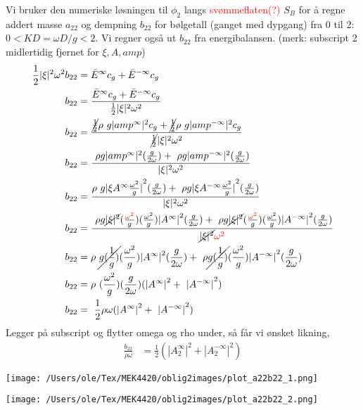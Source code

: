 Vi bruker den numeriske løsningen til $\phi_2$ langs \textcolor{red}{svømmeflaten(?)} $S_B$ for å regne addert masse $a_{22}$ og dempning $b_{22}$ for bølgetall (ganget med dypgang) fra 0 til 2: $0 < KD = \omega D / g < 2$. Vi regner også ut $b_{22}$ fra energibalansen. %
(merk: subscript 2 midlertidig fjernet for $\xi, A, amp$)
\begin{align}
	\frac{1}{2} |\xi|^2 \omega^2 b_{22} &=  {\bar{E}^{\infty} c_g + \bar{E}^{-\infty} c_g }\\
	b_{22} &=  \frac{\bar{E}^{\infty} c_g + \bar{E}^{-\infty} c_g }{\frac{1}{2} |\xi|^2 \omega^2}\\
	b_{22} &=  \frac{\cancel{\frac{1}{2}}\rho g |amp^{\infty}|^2  c_g + \cancel{\frac{1}{2}}\rho g |amp^{-\infty}|^2 c_g }{\cancel{\frac{1}{2}} |\xi|^2 \omega^2}\\
	b_{22} &=  \frac{ \rho g |amp^{\infty}|^2  (\frac{g}{2\omega}) +  \rho g |amp^{-\infty}|^2 (\frac{g}{2\omega}) }{ |\xi|^2 \omega^2}\\
	b_{22} &=  \frac{\rho g {|\xi A^{\infty} \frac{\omega^2}{g}|}^2  (\frac{g}{2\omega}) +  \rho g {|\xi A^{-\infty} \frac{\omega^2}{g}|}^2  (\frac{g}{2\omega}) }{ |\xi|^2 \omega^2}\\
	b_{22} &=  \frac{  \rho g \cancel{|\xi|^2} (\frac{\color{red}{\omega^2}}{g})(\frac{\omega^2}{g}) {| A^{\infty} |}^2  (\frac{g}{2\omega}) + \rho g \cancel{|\xi|^2}  (\frac{\color{red}{\omega^2}}{g})(\frac{\omega^2}{g}) {| A^{-\infty}|}^2  (\frac{g}{2\omega}) }{ \cancel{|\xi|^2} \color{red}{\omega^2}}\\
	b_{22} &=   \rho  \cancel{g  (\frac{1}{g})}(\frac{\omega^2}{g}) {| A^{\infty} |}^2  (\frac{g}{2\omega}) +  \rho \cancel{g   (\frac{1}{g})}(\frac{\omega^2}{g}) {| A^{-\infty}|}^2  (\frac{g}{2\omega}) \\
	b_{22} &=  \rho  (\frac{\omega^2}{g})   (\frac{g}{2\omega}) ({| A^{\infty} |}^2 +  {| A^{-\infty}|}^2)\\
	b_{22} &=    \frac{1}{2} \rho \omega ({| A^{\infty} |}^2 +  {| A^{-\infty}|}^2)
\end{align}
Legger på subscript og flytter omega og rho under, så får vi ønsket likning, 
\begin{align}
	\frac{b_{22}}{\rho \omega} &=    \frac{1}{2}  ({| A_2^{\infty} |}^2 +  {| A_2^{-\infty}|}^2)
\end{align}


\noindent
\begin{minipage}[t]{0.45\linewidth}
    \texttt{[image: /Users/ole/Tex/MEK4420/oblig2images/plot\_a22b22\_1.png]}
\end{minipage}
\hspace{0.05\linewidth}
\begin{minipage}[t]{0.45\linewidth}
    \texttt{[image: /Users/ole/Tex/MEK4420/oblig2images/plot\_a22b22\_2.png]}
\end{minipage}

